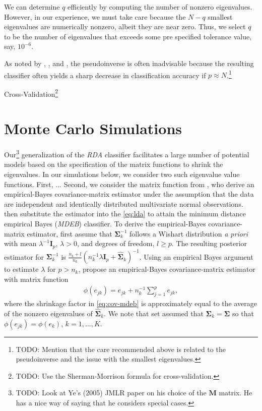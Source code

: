 \documentclass[11pt]{article}
\begin{document}
We can determine $q$ efficiently by computing the number of nonzero eigenvalues. However, in our experience, we must take care because the $N-q$ smallest eigenvalues are numerically nonzero, albeit they are near zero. Thus, we select $q$ to be the number of eigenvalues that exceeds some pre specified tolerance value, say, $10^{-6}$.

As noted by \cite{Hoyle:2011vt}, \cite{Raudys:1998dd}, and \cite{Ramey:2011ji}, the pseudoinverse is often inadvisable because the resulting classifier often yields a sharp decrease in classification accuracy if $p \approx N$.\footnote{TODO: Mention that the care recommended above is related to the pseudoinverse and the issue with the smallest eigenvalues.}

Cross-Validation\footnote{TODO: Use the Sherman-Morrison formula for cross-validation.}

\section{Monte Carlo Simulations}

Our\footnote{TODO: Look at Ye's (2005) JMLR paper on his choice of the $\bm M$ matrix. He has a nice way of saying that he considers special cases.} generalization of the \emph{RDA} classifier facilitates a large number of potential models based on the specification of the matrix functions to shrink the eigenvalues. In our simulations below, we consider two such eigenvalue value functions. First, ...  Second, we consider the matrix function from \cite{Srivastava:2007ww}, who derive an empirical-Bayes covariance-matrix estimator under the assumption that the data are independent and identically distributed multivariate normal observations. \cite{Srivastava:2007ww} then substitute the estimator into the \eqref{eq:lda} to attain the minimum distance empirical Bayes (\emph{MDEB}) classifier. To derive the empirical-Bayes covariance-matrix estimator, \cite{Srivastava:2007ww} first assume that $\bm \Sigma_k^{-1}$ follows a Wishart distribution \emph{a priori} with mean $\lambda^{-1} \bm I_p$, $\lambda > 0$, and degrees of freedom, $l \ge p$. The resulting posterior estimator for $\bm \Sigma_k^{-1}$ is $\frac{n_k + l}{n_k}(n_k^{-1}\lambda \bm I_p + \widehat{\bm \Sigma}_k)^{-1}$. Using an empirical Bayes argument to estimate $\lambda$ for $p > n_k$, \cite{Srivastava:2007ww} propose an empirical-Bayes covariance-matrix estimator with matrix function
\begin{align}
	\phi(e_{jk}) = e_{jk} + n_k^{-1} \sum_{j = 1}^p e_{jk},\label{eq:cov-mdeb}
\end{align}
where the shrinkage factor in \eqref{eq:cov-mdeb} is approximately equal to the average of the nonzero eigenvalues of $\widehat{\bm \Sigma}_k$. We note that \cite{Srivastava:2007ww} set assumed that $\bm \Sigma_k = \bm \Sigma$ so that $\phi(e_{jk}) = \phi(e_k)$, $k = 1, \ldots, K$.
\end{document}
